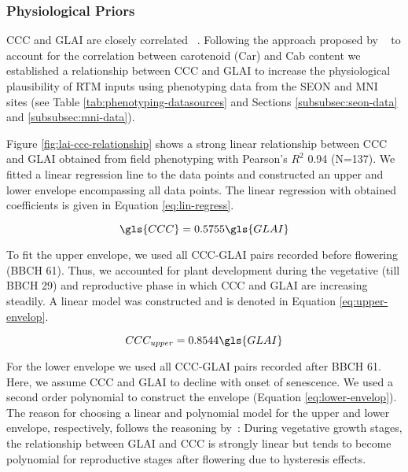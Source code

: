 \subsubsection{Physiological Priors}
\label{subsubsec:physiological-constraints}

CCC and \gls{GLAI} are closely correlated ~\citep{gitelson_remote_2005,gitelson_relationships_2014,gitelson_uncertainty_2022}. Following the approach proposed by ~\cite{wocher_rtm-based_2020} to account for the correlation between carotenoid (Car) and \gls{Cab} content we established a relationship between \gls{CCC} and \gls{GLAI} to increase the physiological plausibility of \gls{RTM} inputs using phenotyping data from the SEON and MNI sites (see Table \ref{tab:phenotyping-datasources} and Sections \ref{subsubsec:seon-data} and \ref{subsubsec:mni-data}).

Figure \ref{fig:lai-ccc-relationship} shows a strong linear relationship between \gls{CCC} and \gls{GLAI} obtained from field phenotyping with Pearson's $R^2$ 0.94 (N=137). We fitted a linear regression line to the data points and constructed an upper and lower envelope encompassing all data points. The linear regression with obtained coefficients is given in Equation \ref{eq:lin-regress}.

\begin{equation}
\label{eq:lin-regress}
    \gls{CCC} = 0.5755 \gls{GLAI}  %
\end{equation}

To fit the upper envelope, we used all CCC-GLAI pairs recorded before flowering (BBCH 61). Thus, we accounted for plant development during the vegetative (till BBCH 29) and reproductive phase in which \gls{CCC} and \gls{GLAI} are increasing steadily. A linear model was constructed and is denoted in Equation \ref{eq:upper-envelop}.

\begin{equation}
\label{eq:upper-envelop}
    CCC_{upper} = 0.8544 \gls{GLAI} %
\end{equation}

For the lower envelope we used all CCC-GLAI pairs recorded after BBCH 61. Here, we assume \gls{CCC} and \gls{GLAI} to decline with onset of senescence. We used a second order polynomial to construct the envelope (Equation \ref{eq:lower-envelop}). The reason for choosing a linear and polynomial model for the upper and lower envelope, respectively, follows the reasoning by~\cite{gitelson_relationships_2014}: During vegetative growth stages, the relationship between \gls{GLAI} and \gls{CCC} is strongly linear but tends to become polynomial for reproductive stages after flowering due to hysteresis effects.

